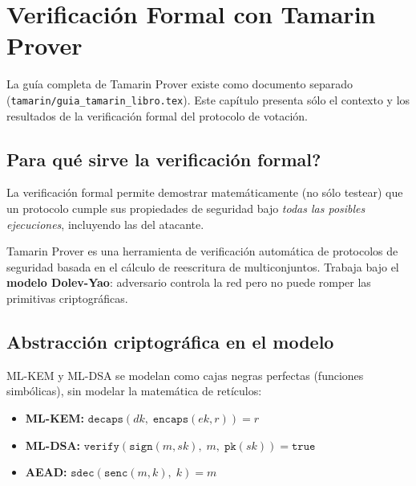 \documentclass[12pt,a4paper,twoside,openright]{book}
\theoremstyle{plain}
\theoremstyle{definition}
\theoremstyle{remark}
\begin{document}
\chapter{Verificaci\'on Formal con Tamarin Prover}
\label{chap:tamarin}

\begin{minota}
  La gu\'ia completa de Tamarin Prover existe como documento separado
  (\texttt{tamarin/guia\_tamarin\_libro.tex}). Este cap\'itulo presenta
  s\'olo el contexto y los resultados de la verificaci\'on formal del
  protocolo de votaci\'on.
\end{minota}

\section{\textquestiondown Para qu\'e sirve la verificaci\'on formal?}

La verificaci\'on formal permite demostrar matem\'aticamente (no s\'olo
testear) que un protocolo cumple sus propiedades de seguridad bajo
\emph{todas las posibles ejecuciones}, incluyendo las del atacante.

Tamarin Prover es una herramienta de verificaci\'on autom\'atica de protocolos
de seguridad basada en el c\'alculo de reescritura de multiconjuntos. Trabaja
bajo el \textbf{modelo Dolev-Yao}: adversario controla la red pero no puede
romper las primitivas criptogr\'aficas.

\section{Abstracci\'on criptogr\'afica en el modelo}

ML-KEM y ML-DSA se modelan como cajas negras perfectas (funciones
simb\'olicas), sin modelar la matem\'atica de ret\'iculos:

\begin{itemize}
  \item \textbf{ML-KEM:}
    $\mathtt{decaps}(dk,\; \mathtt{encaps}(ek, r)) = r$
  \item \textbf{ML-DSA:}
    $\mathtt{verify}(\mathtt{sign}(m, sk),\; m,\; \mathtt{pk}(sk)) = \mathtt{true}$
  \item \textbf{AEAD:}
    $\mathtt{sdec}(\mathtt{senc}(m, k),\; k) = m$
\end{itemize}
\end{document}

